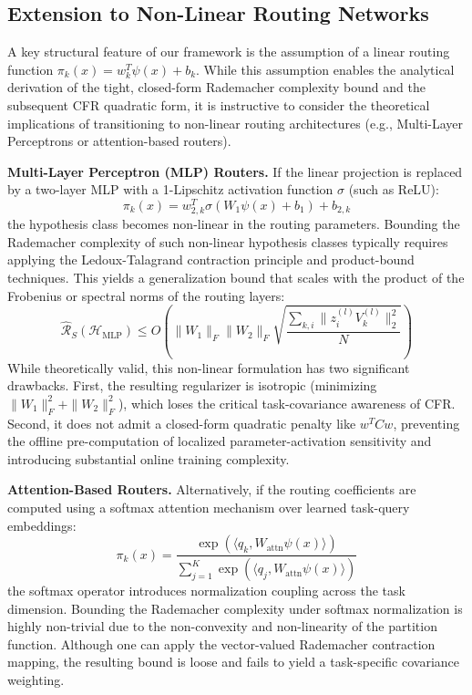 \subsection{Extension to Non-Linear Routing Networks}
A key structural feature of our framework is the assumption of a linear routing function $\pi_k(x) = w_k^T \psi(x) + b_k$. While this assumption enables the analytical derivation of the tight, closed-form Rademacher complexity bound and the subsequent CFR quadratic form, it is instructive to consider the theoretical implications of transitioning to non-linear routing architectures (e.g., Multi-Layer Perceptrons or attention-based routers).

\textbf{Multi-Layer Perceptron (MLP) Routers.} If the linear projection is replaced by a two-layer MLP with a 1-Lipschitz activation function $\sigma$ (such as ReLU):
\begin{equation}
    \pi_k(x) = w_{2, k}^T \sigma\left( W_1 \psi(x) + b_1 \right) + b_{2, k}
\end{equation}
the hypothesis class becomes non-linear in the routing parameters. Bounding the Rademacher complexity of such non-linear hypothesis classes typically requires applying the Ledoux-Talagrand contraction principle and product-bound techniques. This yields a generalization bound that scales with the product of the Frobenius or spectral norms of the routing layers:
\begin{equation}
    \hat{\mathcal{R}}_S(\mathcal{H}_{\text{MLP}}) \leq O\left( \|W_1\|_F \|W_2\|_F \sqrt{\frac{\sum_{k, i} \|z_i^{(l)} V_k^{(l)}\|_2^2}{N}} \right)
\end{equation}
While theoretically valid, this non-linear formulation has two significant drawbacks. First, the resulting regularizer is isotropic (minimizing $\|W_1\|_F^2 + \|W_2\|_F^2$), which loses the critical task-covariance awareness of CFR. Second, it does not admit a closed-form quadratic penalty like $w^T C w$, preventing the offline pre-computation of localized parameter-activation sensitivity and introducing substantial online training complexity.

\textbf{Attention-Based Routers.} Alternatively, if the routing coefficients are computed using a softmax attention mechanism over learned task-query embeddings:
\begin{equation}
    \pi_k(x) = \frac{\exp(\langle q_k, W_{\text{attn}} \psi(x) \rangle)}{\sum_{j=1}^K \exp(\langle q_j, W_{\text{attn}} \psi(x) \rangle)}
\end{equation}
the softmax operator introduces normalization coupling across the task dimension. Bounding the Rademacher complexity under softmax normalization is highly non-trivial due to the non-convexity and non-linearity of the partition function. Although one can apply the vector-valued Rademacher contraction mapping, the resulting bound is loose and fails to yield a task-specific covariance weighting. 

